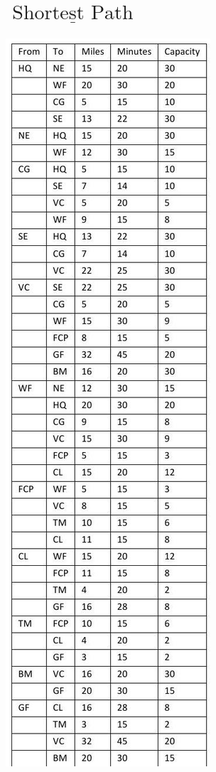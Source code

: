 \documentclass[10pt]{article}
\begin{document}
\section{$\underline{\text { Shortest Path }}$}
\includegraphics[max width=\textwidth]{2022_07_05_5945264bba2a5f6ba667g-47}
\end{document}
